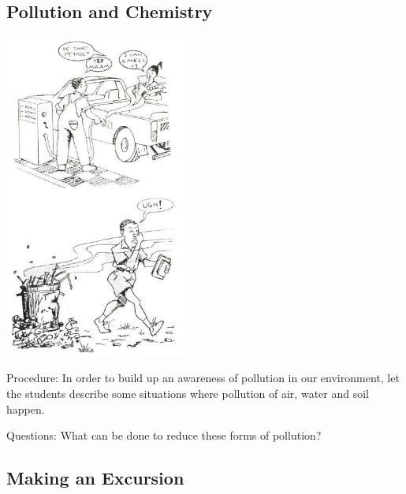 \begin{multicols}{2}
\vfill
\columnbreak


\subsection{Pollution and Chemistry}

\begin{center}
\includegraphics[width=0.45\textwidth]{./img/source/chemical-pollution.jpg}
\end{center}

\begin{description*}
\item[Procedure:]{In order to build up an awareness of pollution
in our environment, let the students describe
some situations where pollution of air, water
and soil happen.}
\item[Questions:]{What can be done to reduce these forms of pollution?}
\end{description*}

\subsection{Making an Excursion}


\end{multicols}

